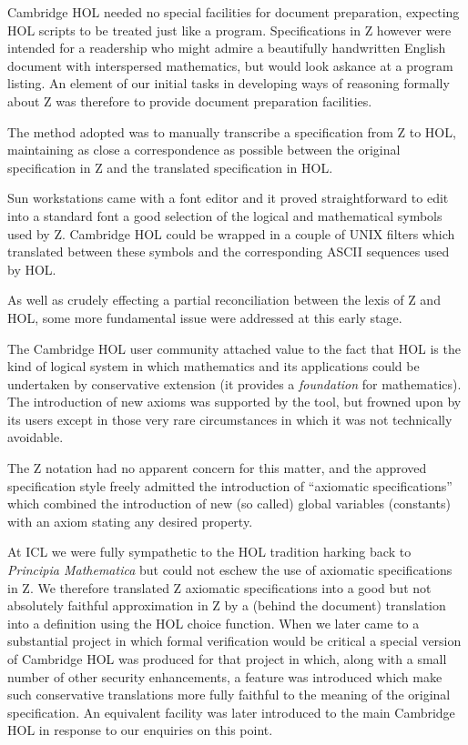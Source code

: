 \documentclass[10pt,titlepage]{book}
\begin{document}
Cambridge HOL needed no special facilities for document preparation, expecting HOL scripts to be treated just like a program.
Specifications in Z however were intended for a readership who might admire a beautifully handwritten English document with interspersed mathematics, but would look askance at a program listing.
An element of our initial tasks in developing ways of reasoning formally about Z was therefore to provide document preparation facilities.

The method adopted was to manually transcribe a specification from Z to HOL, maintaining as close a correspondence as possible between the original specification in Z and the translated specification in HOL.

Sun workstations came with a font editor and it proved straightforward to edit into a standard font a good selection of the logical and mathematical symbols used by Z.
Cambridge HOL could be wrapped in a couple of UNIX filters which translated between these symbols and the corresponding ASCII sequences used by HOL.

As well as crudely effecting a partial reconciliation between the lexis of Z and HOL, some more fundamental issue were addressed at this early stage.

The Cambridge HOL user community attached value to the fact that HOL is the kind of logical system in which mathematics and its applications could be undertaken by conservative extension (it provides a {\it foundation} for mathematics).
The introduction of new axioms was supported by the tool, but frowned upon by its users except in those very rare circumstances in which it was not technically avoidable.

The Z notation had no apparent concern for this matter, and the approved specification style freely admitted the introduction of ``axiomatic specifications'' which combined the introduction of new (so called) global variables (constants) with an axiom stating any desired property.

At ICL we were fully sympathetic to the HOL tradition harking back to {\it Principia Mathematica} but could not eschew the use of axiomatic specifications in Z.
We therefore translated Z axiomatic specifications into a good but not absolutely faithful approximation in Z by a (behind the document) translation into a definition using the HOL choice function.
When we later came to a substantial project in which formal verification would be critical a special version of Cambridge HOL was produced for that project in which, along with a small number of other security enhancements, a feature was introduced which make such conservative translations more fully faithful to the meaning of the original specification.
An equivalent facility was later introduced to the main Cambridge HOL in response to our enquiries on this point.
\end{document}
